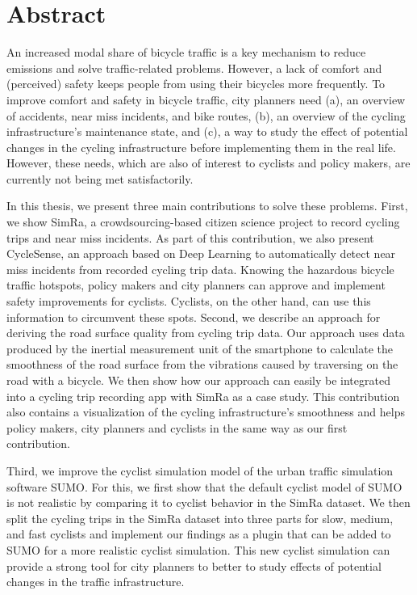 
\cleardoublepage
{}
\section*{Abstract}
An increased modal share of bicycle traffic is a key mechanism to reduce emissions and solve traffic-related problems.
However, a lack of comfort and (perceived) safety keeps people from using their bicycles more frequently.
To improve comfort and safety in bicycle traffic, city planners need (a), an overview of accidents, near miss incidents, and bike routes, (b), an overview of the cycling infrastructure's maintenance state, and (c), a way to study the effect of potential changes in the cycling infrastructure before implementing them in the real life.
However, these needs, which are also of interest to cyclists and policy makers, are currently not being met satisfactorily.

In this thesis, we present three main contributions to solve these problems.
First, we show SimRa, a crowdsourcing-based citizen science project to record cycling trips and near miss incidents.
As part of this contribution, we also present CycleSense, an approach based on Deep Learning to automatically detect near miss incidents from recorded cycling trip data.
Knowing the hazardous bicycle traffic hotspots, policy makers and city planners can approve and implement safety improvements for cyclists.
Cyclists, on the other hand, can use this information to circumvent these spots.
Second, we describe an approach for deriving the road surface quality from cycling trip data.
Our approach uses data produced by the inertial measurement unit of the smartphone to calculate the smoothness of the road surface from the vibrations caused by traversing on the road with a bicycle. 
We then show how our approach can easily be integrated into a cycling trip recording app with SimRa as a case study.
This contribution also contains a visualization of the cycling infrastructure's smoothness and helps policy makers, city planners and cyclists in the same way as our first contribution.

Third, we improve the cyclist simulation model of the urban traffic simulation software SUMO.
For this, we first show that the default cyclist model of SUMO is not realistic by comparing it to cyclist behavior in the SimRa dataset.
We then split the cycling trips in the SimRa dataset into three parts for slow, medium, and fast cyclists and implement our findings as a plugin that can be added to SUMO for a more realistic cyclist simulation.
This new cyclist simulation can provide a strong tool for city planners to better to study effects of potential changes in the traffic infrastructure. 


